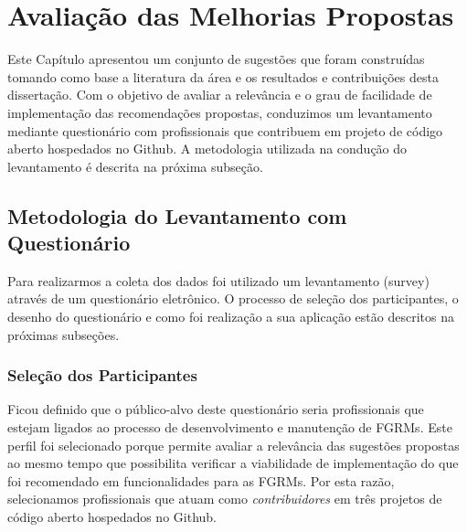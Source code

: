 


\section{Avaliação das Melhorias Propostas}
\label{sec:sug_melhoria_avaliacao_das_melhorias}

Este Capítulo apresentou um conjunto de sugestões que foram construídas tomando
como base a literatura da área e os resultados e contribuições desta
dissertação. Com o objetivo de avaliar a relevância e o grau de facilidade de
implementação das recomendações propostas, conduzimos um levantamento mediante
questionário com profissionais que contribuem em projeto de código aberto
hospedados no Github. A metodologia utilizada na condução do levantamento é
descrita na próxima subseção.

\subsection{Metodologia do Levantamento com Questionário}
\label{sub:sug_melhoria_metodologia_levantamento}

Para realizarmos a coleta dos dados foi utilizado um levantamento (survey)
através de um questionário eletrônico. O processo de seleção dos participantes,
o desenho do questionário e como foi realização a sua aplicação estão descritos
na próximas subseções.

\subsubsection{Seleção dos Participantes}
\label{ssub:sug_melhoria_selecao_participantes}

Ficou definido que o público-alvo deste questionário seria profissionais que
estejam ligados ao processo de desenvolvimento e manutenção de FGRMs. Este
perfil foi selecionado porque permite avaliar a relevância das sugestões
propostas ao mesmo tempo que possibilita verificar a viabilidade de
implementação do que foi recomendado em funcionalidades para as FGRMs. Por esta
razão, selecionamos profissionais que atuam como \textit{contribuidores} em três
projetos de código aberto hospedados no Github.

